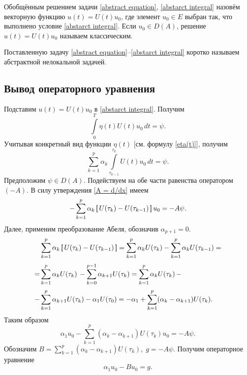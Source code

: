\documentclass{article}
\newcommand{\h}{\textsf}
\theoremstyle{definition}
\begin{document}
Обобщённым решением задачи \eqref{abstract equation}, \eqref{abstarct integral} назовём векторную функцию \linebreak $ u(t) = U(t)u_0 $, 
где элемент $ u_0 \in E $ выбран так, что выполнено условие \eqref{abstarct integral}. Если $ u_0 \in D(A) $, решение 
$ u(t) = U(t)u_0 $ называем классическим.

Поставленную задачу \eqref{abstract equation}--\eqref{abstarct integral} коротко называем абстрактной нелокальной задачей.

\subsection{Вывод операторного уравнения} %
Подставим $ u(t) = U(t)u_0 $ в \eqref{abstarct integral}. Получим 
\begin{equation*}
	\int\limits_{0}^{T} \eta(t)U(t)u_0\,dt = \psi.
\end{equation*}
Учитывая конкретный вид функции $\eta(t)$ [см. формулу \eqref{eta(t)}], получим
\begin{equation*}
	\sum\limits_{k = 1}^{p} \alpha_k \int\limits_{\tau_{k - 1}}^{\tau_k} U(t)u_0\,dt = \psi.
\end{equation*}
Предположим $\psi \in D(A)$. Подействуем на обе части равенства оператором $(-A)$. В силу утверждения \ref{A = d/dx} имеем
\begin{equation*} 
	-\sum\limits_{k = 1}^{p} \alpha_k \,\h[\, U(\tau_k) - U(\tau_{k - 1}) \,\h]\, u_0 = -A\psi.
\end{equation*}
Далее, применим преобразование Абеля, обозначив $ \alpha_{p + 1} = 0 $.
\begin{equation*}
\begin{aligned}
	  & \sum\limits_{k = 1}^{p} \alpha_k \,\h[\, U(\tau_k) - U(\tau_{k - 1}) \,\h] = \sum\limits_{k = 1}^{p} \alpha_k U(\tau_k) - 
		\sum\limits_{k = 1}^{p} \alpha_k U(\tau_{k - 1}) = \\[1mm]
	= & \sum\limits_{k = 1}^{p} \alpha_k U(\tau_k)\, - \sum\limits_{k = 0}^{p - 1} \alpha_{k + 1} U(\tau_k) = 
	\sum\limits_{k = 1}^{p} \alpha_k U(\tau_k)\, - \\[1mm]
	- & \sum\limits_{k = 1}^{p} \alpha_{k + 1} U(\tau_k) - \alpha_1 U(\tau_0) = 
		-\alpha_1 + \sum\limits_{k = 1}^{p} (\alpha_k - \alpha_{k + 1})U(\tau_k).
\end{aligned}
\end{equation*}
Таким образом
\begin{equation*}
	\alpha_1 u_0 - \sum\limits_{k = 1}^{p} (\alpha_k - \alpha_{k + 1})U(\tau_k)u_0 = -A\psi.
\end{equation*}
Обозначим $ B = \sum\limits_{k = 1}^{p} (\alpha_k - \alpha_{k + 1})U(\tau_k), \; g = -A\psi $. Получим операторное уравнение
\begin{equation} \label{operator equation}
	\alpha_1 u_0 - Bu_0 = g.
\end{equation}
\end{document}
